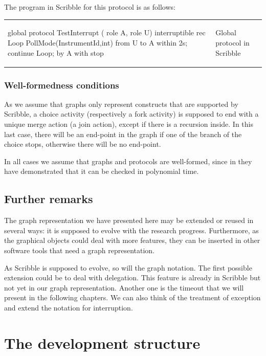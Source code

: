 \documentclass[a4paper,11pt,twoside]{report}
\begin{document}
The program in Scribble for this protocol is as follows:
\begin{center}
\begin{tabular}{ll}
\begin{SJLISTING}
global protocol TestInterrupt ( role A, role U) {
	interruptible {
		rec Loop {
			PollMode(InstrumentId,int) from U to A within 2s;
			continue Loop;
		}
	} by A with stop
}
\end{SJLISTING}
& Global protocol in Scribble\\
\end{tabular}
\end{center}


\subsection{Well-formedness conditions}
As we assume that graphs only represent constructs that are supported by Scribble, a choice activity (respectively a fork activity) is supposed to end with a unique merge action (a join action), except if there is a recursion inside. In this last case, there will be an end-point in the graph if one of the branch of the choice stops, otherwise there will be no end-point.

In all cases we assume that graphs and protocols are well-formed, since in \cite{denielou2012multiparty} they have demonstrated that it can be checked in polynomial time.

\section{Further remarks}
The graph representation we have presented here may be extended or reused in several ways: it is supposed to evolve with the research progress. Furthermore, as the graphical objects could deal with more features, they can be inserted in other software tools that need a graph representation.

As Scribble is supposed to evolve, so will the graph notation. The first possible extension could be to deal with delegation. This feature is already in Scribble but not yet in our graph representation. Another one is the timeout that we will present in the following chapters. We can also think of the treatment of exception and extend the notation for interruption.




\chapter{The development structure}
\end{document}
